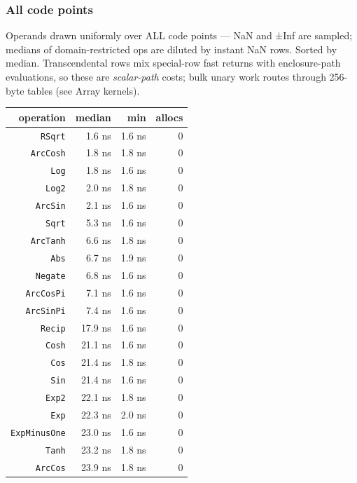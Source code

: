 \subsubsection{All code points}



\label{8134844262983830456}{}


Operands drawn uniformly over ALL code points — NaN and ±Inf are sampled; medians of domain-restricted ops are diluted by instant NaN rows. Sorted by median. Transcendental rows mix special-row fast returns with enclosure-path evaluations, so these are \emph{scalar-path} costs; bulk unary work routes through 256-byte tables (see Array kernels).




\begin{table}[h]
\centering
\begin{tabulary}{\linewidth}{R R R R}
\toprule
operation & median & min & allocs \\
\toprule
\texttt{RSqrt} & 1.6 ns & 1.6 ns & 0 \\
\texttt{ArcCosh} & 1.8 ns & 1.8 ns & 0 \\
\texttt{Log} & 1.8 ns & 1.6 ns & 0 \\
\texttt{Log2} & 2.0 ns & 1.8 ns & 0 \\
\texttt{ArcSin} & 2.1 ns & 1.6 ns & 0 \\
\texttt{Sqrt} & 5.3 ns & 1.6 ns & 0 \\
\texttt{ArcTanh} & 6.6 ns & 1.8 ns & 0 \\
\texttt{Abs} & 6.7 ns & 1.9 ns & 0 \\
\texttt{Negate} & 6.8 ns & 1.6 ns & 0 \\
\texttt{ArcCosPi} & 7.1 ns & 1.6 ns & 0 \\
\texttt{ArcSinPi} & 7.4 ns & 1.6 ns & 0 \\
\texttt{Recip} & 17.9 ns & 1.6 ns & 0 \\
\texttt{Cosh} & 21.1 ns & 1.6 ns & 0 \\
\texttt{Cos} & 21.4 ns & 1.8 ns & 0 \\
\texttt{Sin} & 21.4 ns & 1.6 ns & 0 \\
\texttt{Exp2} & 22.1 ns & 1.8 ns & 0 \\
\texttt{Exp} & 22.3 ns & 2.0 ns & 0 \\
\texttt{ExpMinusOne} & 23.0 ns & 1.6 ns & 0 \\
\texttt{Tanh} & 23.2 ns & 1.8 ns & 0 \\
\texttt{ArcCos} & 23.9 ns & 1.8 ns & 0 \\

\end{tabulary}
\end{table}
